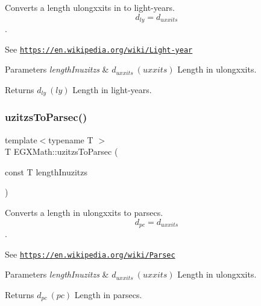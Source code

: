 Converts a length ulongxxits in to light-\/years. \[ d_{ly}=d_{uxxits} \]. 

See \href{https://en.wikipedia.org/wiki/Light-year}{\tt https\+://en.\+wikipedia.\+org/wiki/\+Light-\/year} 
\begin{DoxyParams}{Parameters}
{\em length\+Inuzitzs} & $ d_{uxxits}\ (uxxits)$ Length in ulongxxits. \\
\hline
\end{DoxyParams}
\begin{DoxyReturn}{Returns}
$ d_{ly}\ (ly)$ Length in light-\/years. 
\end{DoxyReturn}
\mbox{\label{group___e_g_x_math-_conversions-_length_conversions-uzitzs-_astronomical_ga028a17a589e3f3d0c09daa6fbe664989}} 
\subsubsection{\texorpdfstring{uzitzs\+To\+Parsec()}{uzitzsToParsec()}}
{\footnotesize\ttfamily template$<$typename T $>$ \\
T E\+G\+X\+Math\+::uzitzs\+To\+Parsec (\begin{DoxyParamCaption}\item[{const T}]{length\+Inuzitzs }\end{DoxyParamCaption})}



Converts a length in ulongxxits to parsecs. \[ d_{pc}=d_{uxxits} \]. 

See \href{https://en.wikipedia.org/wiki/Parsec}{\tt https\+://en.\+wikipedia.\+org/wiki/\+Parsec} 
\begin{DoxyParams}{Parameters}
{\em length\+Inuzitzs} & $ d_{uxxits}\ (uxxits)$ Length in ulongxxits. \\
\hline
\end{DoxyParams}
\begin{DoxyReturn}{Returns}
$ d_{pc}\ (pc)$ Length in parsecs. 
\end{DoxyReturn}

